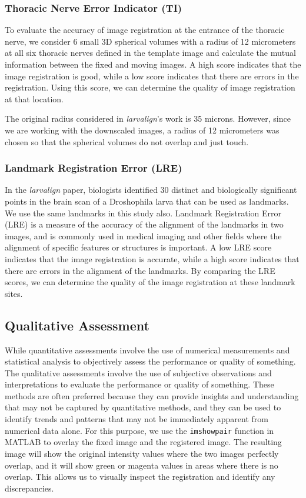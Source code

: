 \documentclass{report}
\begin{document}
	\subsubsection{Thoracic Nerve Error Indicator (TI)}
	To evaluate the accuracy of image registration at the entrance of the thoracic nerve, we consider 6 small 3D spherical volumes with a radius of 12 micrometers at all six thoracic nerves defined in the template image and calculate the mutual information between the fixed and moving images. A high score indicates that the image registration is good, while a low score indicates that there are errors in the registration. Using this score, we can determine the quality of image registration at that location.
	
	The original radius considered in \textit{larvalign}'s work \cite{larvalign} is 35 microns. However, since we are working with the downscaled images, a radius of 12 micrometers was chosen so that the spherical volumes do not overlap and just touch.
	
	\subsubsection{Landmark Registration Error (LRE)}
	In the \textit{larvalign} paper, biologists identified 30 distinct and biologically significant points in the brain scan of a Droshophila larva that can be used as landmarks. We use the same landmarks in this study also. Landmark Registration Error (LRE) is a measure of the accuracy of the alignment of the landmarks in two images, and is commonly used in medical imaging and other fields where the alignment of specific features or structures is important. A low LRE score indicates that the image registration is accurate, while a high score indicates that there are errors in the alignment of the landmarks. By comparing the LRE scores, we can determine the quality of the image registration at these landmark sites.
	
	\subsection{Qualitative Assessment}
	While quantitative assessments involve the use of numerical measurements and statistical analysis to objectively assess the performance or quality of something. The qualitative assessments involve the use of subjective observations and interpretations to evaluate the performance or quality of something. These methods are often preferred because they can provide insights and understanding that may not be captured by quantitative methods, and they can be used to identify trends and patterns that may not be immediately apparent from numerical data alone.
	For this purpose, we use the \texttt{imshowpair} function in MATLAB to overlay the fixed image and the registered image. The resulting image will show the original intensity values where the two images perfectly overlap, and it will show green or magenta values in areas where there is no overlap. This allows us to visually inspect the registration and identify any discrepancies.
	
\end{document}
